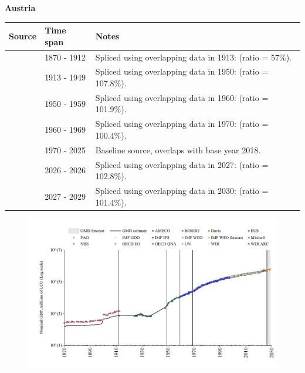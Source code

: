\documentclass[12pt,a4paper,landscape]{article}
\begin{document}
\begin{adjustbox}{max totalsize={\paperwidth}{\paperheight},center}
\begin{minipage}[t][\textheight][t]{\textwidth}
\vspace*{0.5cm}
{}
\begin{center}
{\Large\bfseries Austria}
\end{center}
\vspace{0.5cm}
\begin{table}[H]
\centering
\small
\begin{tabular}{|l|l|l|}
\hline
\textbf{Source} & \textbf{Time span} & \textbf{Notes} \\
\hline
\rowcolor{white}\cite{NBS}& 1870 - 1912 &Spliced using overlapping data in 1913: (ratio = 57\%).\\
\rowcolor{lightgray}\cite{Mitchell}& 1913 - 1949 &Spliced using overlapping data in 1950: (ratio = 107.8\%).\\
\rowcolor{white}\cite{IMF_GDD}& 1950 - 1959 &Spliced using overlapping data in 1960: (ratio = 101.9\%).\\
\rowcolor{lightgray}\cite{AMECO}& 1960 - 1969 &Spliced using overlapping data in 1970: (ratio = 100.4\%).\\
\rowcolor{white}\cite{OECD_EO}& 1970 - 2025 &Baseline source, overlaps with base year 2018.\\
\rowcolor{lightgray}\cite{AMECO}& 2026 - 2026 &Spliced using overlapping data in 2027: (ratio = 102.8\%).\\
\rowcolor{white}\cite{IMF_WEO_forecast}& 2027 - 2029 &Spliced using overlapping data in 2030: (ratio = 101.4\%).\\
\hline
\end{tabular}
\end{table}
\begin{figure}[H]
\centering
\includegraphics[width=\textwidth,height=0.6\textheight,keepaspectratio]{graphs/AUT_nGDP.pdf}
\end{figure}
\end{minipage}
\end{adjustbox}
\end{document}
